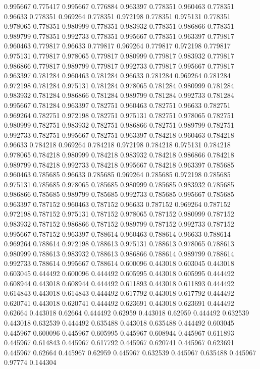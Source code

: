0.995667 0.775417
0.995667 0.776884
0.963397 0.778351
0.960463 0.778351
0.96633 0.778351
0.969264 0.778351
0.972198 0.778351
0.975131 0.778351
0.978065 0.778351
0.980999 0.778351
0.983932 0.778351
0.986866 0.778351
0.989799 0.778351
0.992733 0.778351
0.995667 0.778351
0.963397 0.779817
0.960463 0.779817
0.96633 0.779817
0.969264 0.779817
0.972198 0.779817
0.975131 0.779817
0.978065 0.779817
0.980999 0.779817
0.983932 0.779817
0.986866 0.779817
0.989799 0.779817
0.992733 0.779817
0.995667 0.779817
0.963397 0.781284
0.960463 0.781284
0.96633 0.781284
0.969264 0.781284
0.972198 0.781284
0.975131 0.781284
0.978065 0.781284
0.980999 0.781284
0.983932 0.781284
0.986866 0.781284
0.989799 0.781284
0.992733 0.781284
0.995667 0.781284
0.963397 0.782751
0.960463 0.782751
0.96633 0.782751
0.969264 0.782751
0.972198 0.782751
0.975131 0.782751
0.978065 0.782751
0.980999 0.782751
0.983932 0.782751
0.986866 0.782751
0.989799 0.782751
0.992733 0.782751
0.995667 0.782751
0.963397 0.784218
0.960463 0.784218
0.96633 0.784218
0.969264 0.784218
0.972198 0.784218
0.975131 0.784218
0.978065 0.784218
0.980999 0.784218
0.983932 0.784218
0.986866 0.784218
0.989799 0.784218
0.992733 0.784218
0.995667 0.784218
0.963397 0.785685
0.960463 0.785685
0.96633 0.785685
0.969264 0.785685
0.972198 0.785685
0.975131 0.785685
0.978065 0.785685
0.980999 0.785685
0.983932 0.785685
0.986866 0.785685
0.989799 0.785685
0.992733 0.785685
0.995667 0.785685
0.963397 0.787152
0.960463 0.787152
0.96633 0.787152
0.969264 0.787152
0.972198 0.787152
0.975131 0.787152
0.978065 0.787152
0.980999 0.787152
0.983932 0.787152
0.986866 0.787152
0.989799 0.787152
0.992733 0.787152
0.995667 0.787152
0.963397 0.788614
0.960463 0.788614
0.96633 0.788614
0.969264 0.788614
0.972198 0.788613
0.975131 0.788613
0.978065 0.788613
0.980999 0.788613
0.983932 0.788613
0.986866 0.788614
0.989799 0.788614
0.992733 0.788614
0.995667 0.788614
0.600096 0.443018
0.603045 0.443018
0.603045 0.444492
0.600096 0.444492
0.605995 0.443018
0.605995 0.444492
0.608944 0.443018
0.608944 0.444492
0.611893 0.443018
0.611893 0.444492
0.614843 0.443018
0.614843 0.444492
0.617792 0.443018
0.617792 0.444492
0.620741 0.443018
0.620741 0.444492
0.623691 0.443018
0.623691 0.444492
0.62664 0.443018
0.62664 0.444492
0.62959 0.443018
0.62959 0.444492
0.632539 0.443018
0.632539 0.444492
0.635488 0.443018
0.635488 0.444492
0.603045 0.445967
0.600096 0.445967
0.605995 0.445967
0.608944 0.445967
0.611893 0.445967
0.614843 0.445967
0.617792 0.445967
0.620741 0.445967
0.623691 0.445967
0.62664 0.445967
0.62959 0.445967
0.632539 0.445967
0.635488 0.445967
0.97774 0.144304
